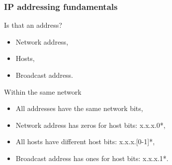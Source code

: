  \begin{frame}
    \frametitle{IP addressing fundamentals}
    \begin{block}{Is that an address?}
      \begin{itemize}
        \item Network address,\pause
        \item Hosts,\pause
        \item Broadcast address.\pause
      \end{itemize}
    \end{block}
    \begin{block}{Within the same network}
      \begin{itemize}
        \item All addresses have the same {\color{ForestGreen}network} bits,\pause
        \item Network address has zeros for {\color{blue}host} bits: {\color{ForestGreen}x.x.x}.{\color{blue}0*},\pause
        \item All {\color{blue}hosts} have different {\color{blue}host} bits: {\color{ForestGreen}x.x.x}.{\color{blue}[0-1]*},\pause
        \item Broadcast address has ones for {\color{blue}host} bits: {\color{ForestGreen}x.x.x}.{\color{blue}1*}.
      \end{itemize}
    \end{block}
  \end{frame}

